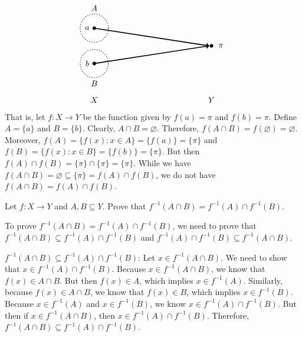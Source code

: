 \documentclass[11pt,letterpaper]{article}
\begin{document}
\begin{enumerate}[(a)]
\[\begin{tikzpicture}
	\draw[line width=0.03cm,dotted] (0,0.75) circle (0.6 and 0.6);
	\draw[line width=0.03cm,dotted] (0,-0.75) circle (0.6 and 0.6);
	
	\draw[fill=black] (0,0.75) circle (0.07);
	\draw[fill=black] (0,-0.75) circle (0.07);
	
	\draw[fill=black] (5,0) circle (0.07);
	
	\draw[line width=0.04cm,->] (0,0.75) -- (4.9,0);
	\draw[line width=0.04cm,->] (0,-0.75) -- (4.9,0);
	
	\node at (-0.3,0.75) {$a$};
	\node at (-0.3,-0.75) {$b$};
	
	\node at (0,1.6) {$A$};
	\node at (0,-1.6) {$B$};
	
	\node at (5.4,0) {$\pi$};
	
	\node at (0,-2.3) {$X$};
	\node at (5,-2.3) {$Y$};
	\end{tikzpicture}
	\]
That is, let $f: X \to Y$ be the function given by $f(a)= \pi$ and $f(b)= \pi$. Define $A= \{ a \}$ and $B= \{ b \}$. Clearly, $A \cap B= \varnothing$. Therefore, $f(A \cap B)= f(\varnothing)= \varnothing$. Moreover, $f(A)= \{ f(x) \colon x \in A \}= \{ f(a) \}= \{ \pi \}$ and $f(B)= \{ f(x) \colon x \in B \}= \{ f(b) \}= \{ \pi \}$. But then $f(A) \cap f(B)= \{ \pi \} \cap \{ \pi \}= \{ \pi \}$. While we have $f(A \cap B)= \varnothing \subseteq \{ \pi \}= f(A) \cap f(B)$, we do not have $f(A \cap B)= f(A) \cap f(B)$. 
\end{enumerate}



\newpage



 Let $f: X \to Y$ and $A, B \subseteq Y$. Prove that $f^{-1}(A \cap B)= f^{-1}(A) \cap f^{-1}(B)$. \pspace

\sol To prove $f^{-1}(A \cap B)= f^{-1}(A) \cap f^{-1}(B)$, we need to prove that $f^{-1}(A \cap B) \subseteq f^{-1}(A) \cap f^{-1}(B)$ and $f^{-1}(A) \cap f^{-1}(B) \subseteq f^{-1}(A \cap B)$. \pspace

$f^{-1}(A \cap B) \subseteq f^{-1}(A) \cap f^{-1}(B)$: Let $x \in f^{-1}(A \cap B)$. We need to show that $x \in f^{-1}(A) \cap f^{-1}(B)$. Because $x \in f^{-1}(A \cap B)$, we know that $f(x) \in A \cap B$. But then $f(x) \in A$, which implies $x \in f^{-1}(A)$. Similarly, because $f(x) \in A \cap B$, we know that $f(x) \in B$, which implies $x \in f^{-1}(B)$. Because $x \in f^{-1}(A)$ and $x \in f^{-1}(B)$, we know $x \in f^{-1}(A) \cap f^{-1}(B)$. But then if $x \in f^{-1}(A \cap B)$, then $x \in f^{-1}(A) \cap f^{-1}(B)$. Therefore, $f^{-1}(A \cap B) \subseteq f^{-1}(A) \cap f^{-1}(B)$. \pspace
\end{document}
